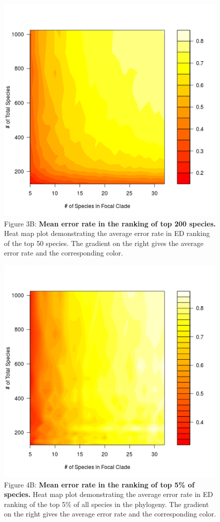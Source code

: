 \documentclass[10pt,english]{article}
\begin{document}
\begin{figure}[!ht]
  \center
  \includegraphics[width=.5\textwidth]{errorRate200.png}
  \caption*{Figure 3B: \textbf{Mean error rate in the ranking of top 200 species.} Heat map
  plot demonstrating the average error rate in ED ranking of the top 50 species.
  The gradient on the right gives the average error rate and the corresponding
  color.}
\end{figure}

\begin{figure}[!ht]
  \center
  \includegraphics[width=.5\textwidth]{errorRate5pct.png}
  \caption*{Figure 4B: \textbf{Mean error rate in the ranking of top 5\% of species.} Heat
  map plot demonstrating the average error rate in ED ranking of the top 5\% of
  all species in the phylogeny. The gradient on the right gives the average
  error rate and the corresponding color.}
\end{figure}
\end{document}
